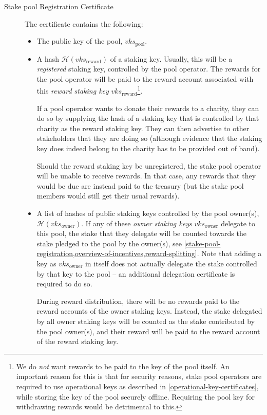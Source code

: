\documentclass[11pt,a4paper,dvipsnames,twosided]{article}
\begin{document}
\begin{description}
\item[Stake pool Registration Certificate]
The certificate contains the following:

\begin{itemize}
\item
  The public key of the pool, \(vks_\text{pool}\).

\item
  A hash \(\mathcal{H}(vks_\text{reward})\) of a staking key. Usually, this will
  be a \emph{registered} staking key, controlled by the pool operator. The
  rewards for the pool operator will be paid to the reward account associated
  with this \emph{reward staking key} \(vks_\text{reward}\)\footnote{We do
    \emph{not} want rewards to be paid to the key of the pool itself. An
    important reason for this is that for security reasons, stake pool
    operators are required to use operational keys as described in
    \cref{operational-key-certificates}, while storing the key of the pool
    securely offline. Requiring the pool key for withdrawing rewards would be
    detrimental to this.}.

  If a pool operator wants to donate their rewards to a charity, they can do so
  by supplying the hash of a staking key that is controlled by that charity as
  the reward staking key. They can then advertise to other stakeholders that
  they are doing so (although evidence that the staking key does indeed belong
  to the charity has to be provided out of band).

  Should the reward staking key be unregistered, the stake pool operator will be
  unable to receive rewards. In that case, any rewards that they would be due
  are instead paid to the treasury (but the stake pool members would still get
  their usual rewards).

\item
  A list of hashes of public staking keys controlled by the pool owner(s),
  \(\mathcal{H}(vks_\text{owner})\). If any of these \emph{owner staking keys}
  \(vks_\text{owner}\) delegate to this pool, the stake that they delegate will
  be counted towards the stake pledged to the pool by the owner(s), see
  \cref{stake-pool-registration,overview-of-incentives,reward-splitting}. Note
  that adding a key as \(vks_\text{owner}\) in itself does not actually delegate
  the stake controlled by that key to the pool -- an additional delegation
  certificate is required to do so.

  During reward distribution, there will be no rewards paid to the reward
  accounts of the owner staking keys. Instead, the stake delegated by all owner
  staking keys will be counted as the stake contributed by the pool owner(s),
  and their reward will be paid to the reward account of the reward staking key.


\end{itemize}
\end{description}
\end{document}
